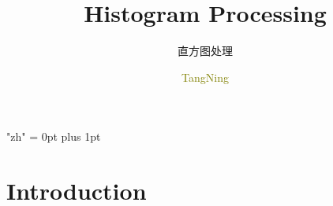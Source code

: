 \documentclass[notheorems,serif,table,compress]{beamer}  %
\begin{document}
\XeTeXlinebreaklocale "zh"         %
\XeTeXlinebreakskip = 0pt plus 1pt %
%


\title{Histogram Processing}
\subtitle{直方图处理}
\author[]{\textcolor{olive}{TangNing}}
\frame{ \titlepage }
\def\hilite<#1>{\temporal<#1>{\color{blue!15}}{\color{black}}{\color{black}}}
\newcommand{\shadow}[2][purple]{\hskip5pt\shadowbox{\color{#1}\small \kai #2\vspace{3mm}}}
\newcommand{\colorrbox}[2][purple]{\doublebox{\color{#1}\small \kai#2}}


\section{Introduction}
\end{document}
